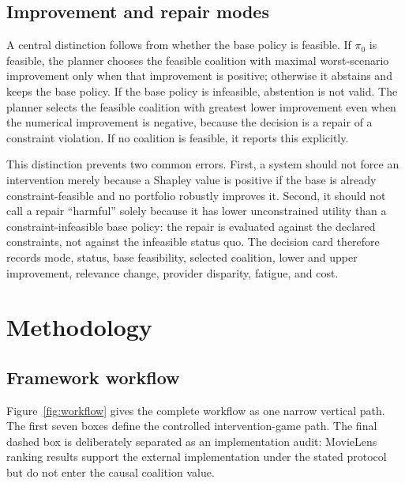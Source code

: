\documentclass[review]{elsarticle}
\theoremstyle{plain}
\theoremstyle{definition}
\theoremstyle{remark}
\newcommand{\BasePolicy}{\pi_0}
\begin{document}
\subsection{Improvement and repair modes}

A central distinction follows from whether the base policy is feasible. If $\BasePolicy$ is feasible, the planner chooses the feasible coalition with maximal worst-scenario improvement only when that improvement is positive; otherwise it abstains and keeps the base policy. If the base policy is infeasible, abstention is not valid. The planner selects the feasible coalition with greatest lower improvement even when the numerical improvement is negative, because the decision is a repair of a constraint violation. If no coalition is feasible, it reports this explicitly.

This distinction prevents two common errors. First, a system should not force an intervention merely because a Shapley value is positive if the base is already constraint-feasible and no portfolio robustly improves it. Second, it should not call a repair ``harmful'' solely because it has lower unconstrained utility than a constraint-infeasible base policy: the repair is evaluated against the declared constraints, not against the infeasible status quo. The decision card therefore records mode, status, base feasibility, selected coalition, lower and upper improvement, relevance change, provider disparity, fatigue, and cost.

\section{Methodology}\label{sec:method}

\subsection{Framework workflow}

Figure~\ref{fig:workflow} gives the complete workflow as one narrow vertical path. The first seven boxes define the controlled intervention-game path. The final dashed box is deliberately separated as an implementation audit: MovieLens ranking results support the external implementation under the stated protocol but do not enter the causal coalition value.
\end{document}
